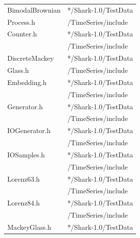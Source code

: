 \documentclass[twocolumn]{article}
\begin{document}
\begin{table}[h]
\begin{center}
{\begin{tabular}{|l|l|}
BimodalBrownian            & */Shark-1.0/TestData                     \\
\hspace*{2mm} Process.h    & \hspace{2mm} /TimeSeries/include         \\\hline
Counter.h                  & */Shark-1.0/TestData                     \\
                           & \hspace{2mm} /TimeSeries/include         \\\hline
DiscreteMackey             & */Shark-1.0/TestData                     \\
\hspace*{2mm} Glass.h      & \hspace{2mm} /TimeSeries/include         \\\hline
Embedding.h                & */Shark-1.0/TestData                     \\
                           & \hspace{2mm} /TimeSeries/include         \\\hline
Generator.h                & */Shark-1.0/TestData                     \\
                           & \hspace{2mm} /TimeSeries/include         \\\hline
IOGenerator.h              & */Shark-1.0/TestData                     \\
                           & \hspace{2mm} /TimeSeries/include         \\\hline
IOSamples.h                & */Shark-1.0/TestData                     \\
                           & \hspace{2mm} /TimeSeries/include         \\\hline
Lorenz63.h                 & */Shark-1.0/TestData                     \\
                           & \hspace{2mm} /TimeSeries/include         \\\hline
Lorenz84.h                 & */Shark-1.0/TestData                     \\
                           & \hspace{2mm} /TimeSeries/include         \\\hline
MackeyGlass.h              & */Shark-1.0/TestData                     \\

\end{tabular}}
\end{center}
\end{table}
\end{document}
